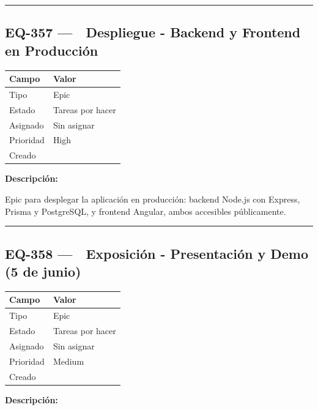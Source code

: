\documentclass[
  spanish,
  11pt,
]{report}
\newcounter{none} %
\begin{document}
\begin{center}\rule{0.5\linewidth}{0.5pt}\end{center}

\subsection{EQ-357 --- 🚀 Despliegue - Backend y Frontend en
Producción}\label{eq-357-despliegue---backend-y-frontend-en-producciuxf3n}

{\def\LTcaptype{none} %
\begin{longtable}[]{@{}ll@{}}
\toprule\noalign{}
Campo & Valor \\
\midrule\noalign{}
\endhead
\bottomrule\noalign{}
\endlastfoot
Tipo & Epic \\
Estado & Tareas por hacer \\
Asignado & Sin asignar \\
Prioridad & High \\
Creado & \\
\end{longtable}
}

\textbf{Descripción:}

Epic para desplegar la aplicación en producción: backend Node.js con
Express, Prisma y PostgreSQL, y frontend Angular, ambos accesibles
públicamente.

\begin{center}\rule{0.5\linewidth}{0.5pt}\end{center}

\subsection{EQ-358 --- 🎤 Exposición - Presentación y Demo (5 de
junio)}\label{eq-358-exposiciuxf3n---presentaciuxf3n-y-demo-5-de-junio}

{\def\LTcaptype{none} %
\begin{longtable}[]{@{}ll@{}}
\toprule\noalign{}
Campo & Valor \\
\midrule\noalign{}
\endhead
\bottomrule\noalign{}
\endlastfoot
Tipo & Epic \\
Estado & Tareas por hacer \\
Asignado & Sin asignar \\
Prioridad & Medium \\
Creado & \\
\end{longtable}
}

\textbf{Descripción:}
\end{document}
